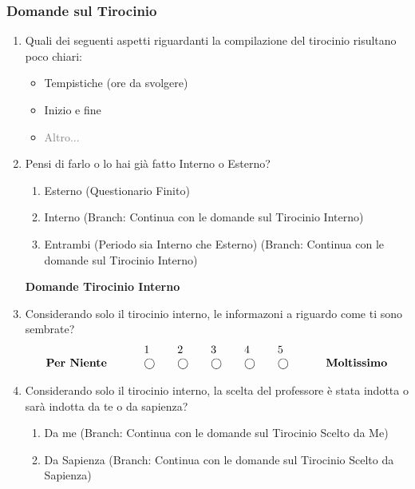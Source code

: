 \subsubsection{Domande sul Tirocinio}
\begin{enumerate}
    \item Quali dei seguenti aspetti riguardanti la compilazione del tirocinio risultano poco chiari:
    \begin{itemize}
        \item Tempistiche (ore da svolgere)
        \item Inizio e fine
        \item \textcolor{gray}{Altro...}
    \end{itemize}
    \item Pensi di farlo o lo hai già fatto Interno o Esterno?
    \begin{enumerate}
        \item Esterno (Questionario Finito)
        \item Interno (Branch: Continua con le domande sul Tirocinio Interno)
        \item Entrambi (Periodo sia Interno che Esterno) (Branch: Continua con le domande sul Tirocinio Interno)
    \end{enumerate}
    \textbf{Domande Tirocinio Interno}
    \item Considerando solo il tirocinio interno, le informazoni a riguardo come ti sono sembrate?
    \begin{equation*}
        \begin{array}{lllllll}
                        &  1 & 2 & 3 & 4 & 5 & \\
    \text { \textbf{Per Niente} } \quad \quad & \bigcirc \quad& \bigcirc \quad& \bigcirc \quad& \bigcirc \quad& \bigcirc \quad& \quad \text { \textbf{Moltissimo} }
        \end{array}
    \end{equation*}

    \item Considerando solo il tirocinio interno, la scelta del professore è stata indotta o sarà indotta da te o da sapienza?
    \begin{enumerate}
        \item Da me (Branch: Continua con le domande sul Tirocinio Scelto da Me)
        \item Da Sapienza (Branch: Continua con le domande sul Tirocinio Scelto da Sapienza)
    \end{enumerate}
\end{enumerate}

